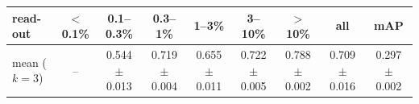\begin{tabular}{lcccccccc}
\toprule
read-out & $<$0.1\% & 0.1--0.3\% & 0.3--1\% & 1--3\% & 3--10\% & $>$10\% & all & mAP \\
\midrule
mean ($k=3$) & -- & 0.544 $\pm$ 0.013 & 0.719 $\pm$ 0.004 & 0.655 $\pm$ 0.011 & 0.722 $\pm$ 0.005 & 0.788 $\pm$ 0.002 & 0.709 $\pm$ 0.016 & 0.297 $\pm$ 0.002 \\
\bottomrule
\end{tabular}
